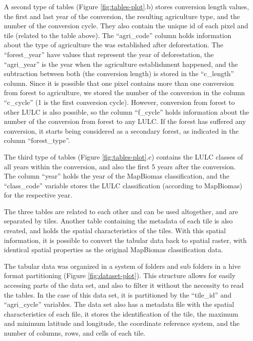 \documentclass[essd, manuscript]{copernicus}
\begin{document}
A second type of tables (Figure \ref{fig:tables-plot}.b) stores conversion length values, the first and last year of the conversion, the resulting agriculture type, and the number of the conversion cycle.
They also contain the unique id of each pixel and tile (related to the table above).
The ``agri\_code'' column holds information about the type of agriculture the was established after deforestation.
The ``forest\_year'' have values that represent the year of deforestation, the ``agri\_year'' is the year when the agriculture establishment happened, and the subtraction between both (the conversion length) is stored in the ``c\_length'' column.
Since it is possible that one pixel contains more than one conversion from forest to agriculture, we stored the number of the conversion in the column ``c\_cycle'' (1 is the first conversion cycle).
However, conversion from forest to other LULC is also possible, so the column ``f\_cycle'' holds information about the number of the conversion from forest to any LULC.
If the forest has suffered any conversion, it starts being considered as a secondary forest, as indicated in the column ``forest\_type''.

The third type of tables (Figure \ref{fig:tables-plot}.c) contains the LULC classes of all years within the conversion, and also the first 5 years after the conversion.
The column ``year'' holds the year of the MapBiomas classification, and the ``class\_code'' variable stores the LULC classification (according to MapBiomas) for the respective year.

The three tables are related to each other and can be used altogether, and are separated by tiles.
Another table containing the metadata of each tile is also created, and holds the spatial characteristics of the tiles.
With this spatial information, it is possible to convert the tabular data back to spatial raster, with identical spatial properties as the original MapBiomas classification data.

The tabular data was organized in a system of folders and sub folders in a hive format partitioning (Figure \ref{fig:dataset-plot}).
This structure allows for easily accessing parts of the data set, and also to filter it without the necessity to read the tables.
In the case of this data set, it is partitioned by the ``tile\_id'' and ``agri\_cycle'' variables.
The data set also has a metadata file with the spatial characteristics of each file, it stores the identification of the tile, the maximum and minimum latitude and longitude, the coordinate reference system, and the number of columns, rows, and cells of each tile.
\end{document}
